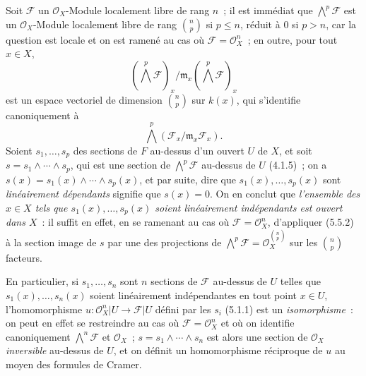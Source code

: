 
\begin{env}[5.5.4]
\label{0.5.5.4-fr}
Soit $\mathcal{F}$ un $\mathcal{O}_X$-Module localement libre de rang $n$~;
il est immédiat que $\bigwedge^p\mathcal{F}$ est un $\mathcal{O}_X$-Module
localement libre de rang $\binom{n}{p}$ si $p\leq n$, réduit à $0$ si $p>n$,
car la question est locale et on est ramené au cas où
$\mathcal{F}=\mathcal{O}_X^n$~; en outre, pour tout $x\in X$,
\[
  (\bigwedge^p\mathcal{F})_x/
  \mathfrak{m}_x(\bigwedge^p\mathcal{F})_x
\]
est un espace vectoriel de dimension $\binom{n}{p}$ sur $k(x)$, qui
s'identifie canoniquement à
\[
  \bigwedge^p(\mathcal{F}_x/\mathfrak{m}_x\mathcal{F}_x).
\]
Soient
$s_1,\ldots,s_p$ des sections de $F$ au-dessus d'un ouvert $U$ de $X$, et
soit $s=s_1\wedge\cdots\wedge s_p$, qui est une section de
$\bigwedge^p\mathcal{F}$ au-dessus de $U$ (4.1.5)~; on a
$s(x)=s_1(x)\wedge\cdots\wedge s_p(x)$, et par suite, dire que
$s_1(x),\ldots,s_p(x)$ sont \emph{linéairement dépendants} signifie que
$s(x)=0$. On en conclut que \emph{l'ensemble des $x\in X$ tels que
$s_1(x),\ldots,s_p(x)$ soient linéairement indépendants est ouvert dans
$X$}~: il suffit en effet, en se ramenant au cas où
$\mathcal{F}=\mathcal{O}_X^n$, d'appliquer (5.5.2) à la section image de $s$
par une des projections de
$\bigwedge^p\mathcal{F}=\mathcal{O}_X^{\binom{n}{p}}$ sur les
$\binom{n}{p}$ facteurs.

En particulier, si $s_1,\ldots,s_n$ sont $n$ sections de $\mathcal{F}$
au-dessus de $U$ telles que $s_1(x),\ldots,s_n(x)$ soient linéairement
indépendantes en tout point $x\in U$, l'homomorphisme
$u:\mathcal{O}_X^n|U\to\mathcal{F}|U$ défini par les $s_i$ (5.1.1) est un
\emph{isomorphisme}~: on peut en effet se restreindre au cas où
$\mathcal{F}=\mathcal{O}_X^n$ et où on identifie canoniquement
$\bigwedge^n\mathcal{F}$ et $\mathcal{O}_X$~;
$s=s_1\wedge\cdots\wedge s_n$ est alors une section de $\mathcal{O}_X$
\emph{inversible} au-dessus de $U$, et on définit un homomorphisme réciproque
de $u$ au moyen des formules de Cramer.
\end{env}

